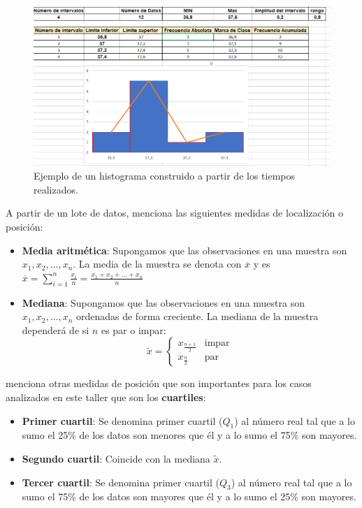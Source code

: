 \begin{figure}[h!]
	\caption{Ejemplo de un histograma construido a partir de los tiempos realizados.}
	\label{fig:03}
	\includegraphics[width=0.8\linewidth]{Trabajos/01/Anexos/03}
\end{figure}

A partir de un lote de datos, \textcite{walpole12} menciona las siguientes medidas de localización o posición:
\begin{itemize}
	\item \textbf{Media aritmética}: Supongamos que las observaciones en una muestra son $x_{1}, x_{2}, \dots ,x_{n}$. La media de la muestra se denota con $\overline{x}$ y es $\overline{x} = \sum_{i=1}^{n} \frac{x_{i}}{n} = \frac{x_{1} + x_{2} + \dots + x_{n}}{n}$
	
	\item \textbf{Mediana}: Supongamos que las observaciones en una muestra son $x_{1}, x_{2}, \dots, x_{n}$ ordenadas de forma creciente. La mediana de la muestra dependerá de si $n$ es par o impar: $$\widetilde{x} = \begin{cases}
		x_{\frac{n+1}{2}} & \text{impar}\\
		x_{\frac{n}{2}} & \text{par}
	\end{cases}$$
\end{itemize}

\textcite{ahumada15} menciona otras medidas de posición que son importantes para los casos analizados en este taller que son los \textbf{cuartiles}:
\begin{itemize}
	\item \textbf{Primer cuartil}: Se denomina primer cuartil ($Q_{1}$) al número real tal que a lo sumo el 25\% de los datos son menores que él y a lo sumo el 75\% son mayores.
	\item \textbf{Segundo cuartil}: Coincide con la mediana $\widetilde{x}$.
	\item \textbf{Tercer cuartil}: Se denomina primer cuartil ($Q_{3}$) al número real tal que a lo sumo el 75\% de los datos son mayores que él y a lo sumo el 25\% son mayores.
\end{itemize}

